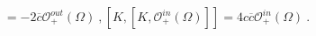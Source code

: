 \begin{equation}
[K,\mathcal{O}^{in}_+(\Omega)]
=-2\overline{c}\mathcal{O}_+^{out}(\Omega)
 \ , 
\left[K,[K,\mathcal{O}_+^{in}(\Omega)]\right]=
4c\overline{c}\mathcal{O}_+^{in}(\Omega) \ .
\end{equation}

